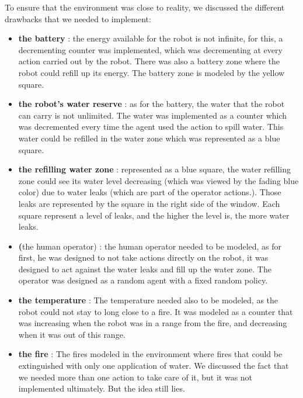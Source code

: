 \documentclass[conference]{IEEEtran}
\begin{document}
To ensure that the environment was close to reality, we discussed the different drawbacks that we needed to implement:
\begin{itemize}
 \item \textbf{the battery} : the energy available for the robot is not infinite, for this, a decrementing counter was implemented, which was decrementing at every action carried out by the robot. There was also a battery zone where the robot could refill up its energy. The battery zone is modeled by the yellow square.\\
 \item \textbf{the robot's water reserve} : as for the battery, the water that the robot can carry is not unlimited. The water was implemented as a counter which was decremented every time the agent used the action to spill water. This water could be refilled in the water zone which was represented as a blue square.\\
 \item \textbf{the refilling water zone} : represented as a blue square, the water refilling zone could see its water level decreasing (which was viewed by the fading blue color) due to water leaks (which are part of the operator actions.). Those leaks are represented by the square in the right side of the window. Each square represent a level of leaks, and the higher the level is, the more water leaks.\\ 
 \item \textbf(the human operator) : the human operator needed to be modeled, as for first, he was designed to not take actions directly on the robot, it was designed to act against the water leaks and fill up the water zone. The operator was designed as a random agent with a fixed random policy.\\
 \item \textbf{the temperature} : The temperature needed also to be modeled, as the robot could not stay to long close to a fire. It was modeled as a counter that was increasing when the robot was in a range from the fire, and decreasing when it was out of this range.\\
 \item \textbf{the fire} : The fires modeled in the environment where fires that could be extinguished with only one application of water. We discussed the fact that we needed more than one action to take care of it, but it was not implemented ultimately. But the idea still lies.
\end{itemize}
\end{document}
